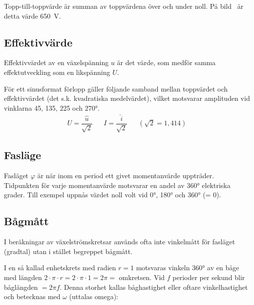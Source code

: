 Topp-till-toppvärde är summan av toppvärdena över och under noll.
På bild~ är detta värde \qty{650}{\volt}.

\subsection{Effektivvärde}
\label{subsec:effektivvaerde}

Effektivvärdet av en växelspänning \(u\) är det värde, som medför samma
effektutveckling som en likspänning \(U\).

För ett sinusformat förlopp gäller följande samband mellan toppvärdet och
effektivvärdet (det s.k. kvadratiska medelvärdet), vilket motsvarar amplituden
vid vinklarna 45, 135, 225 och \ang{270}.
\[
\begin{array}{lllll}
U=\dfrac{\hat{u}}{\sqrt{2}} & & I=\dfrac{\hat{i}}{\sqrt{2}} & & (\sqrt{2} = 1,414)
\end{array}
\]
\subsection{Fasläge}

Fasläget \(\varphi\) är när inom en period ett givet momentanvärde
uppträder.
Tidpunkten för varje momentanvärde motsvarar en andel av \ang{360} elektriska
grader.
Till exempel uppnås värdet noll volt vid \ang{0}, \ang{180} och \ang{360} (= 0\degree).

\subsection{Bågmått}

I beräkningar av växelströmskretsar används ofta inte vinkelmått för fasläget
(gradtal) utan i stället begreppet bågmått.

I en så kallad enhetskrets med radien \(r = 1\) motsvaras vinkeln \ang{360} av
en båge med längden \(2 \cdot \pi \cdot r= 2 \cdot \pi \cdot 1 = 2 \pi =\)
omkretsen.
Vid \(f\) perioder per sekund blir båglängden \(= 2\pi f\).
Denna storhet kallas båghastighet eller oftare vinkelhastighet och betecknas
med \(\omega\) (uttalas omega):
